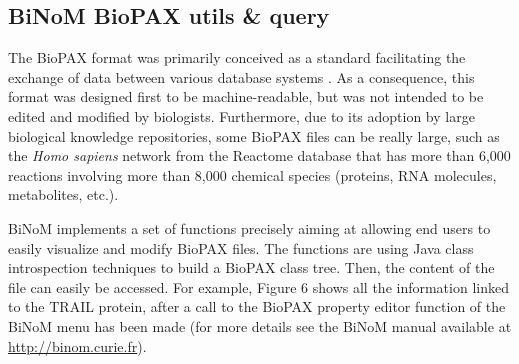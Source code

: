 \documentclass[10pt]{bmc_article}
\newenvironment{bmcformat}{\baselineskip20pt\sloppy\setboolean{publ}{false}}{\baselineskip20pt\sloppy}
\begin{document}
\begin{bmcformat}

\subsection*{BiNoM BioPAX utils \& query}
The BioPAX format was primarily conceived as a standard facilitating the
exchange of data between various database systems \cite{demir2010biopax}. As a
consequence, this format was designed first to be machine-readable, but was not
intended
to be edited and modified by biologists. Furthermore, due to its adoption by
large biological knowledge repositories, some BioPAX files can be really large,
such as the \textit{Homo sapiens} network from the Reactome database
\cite{joshi2005reactome} that has more than 6,000 reactions involving more than
8,000 chemical species (proteins, RNA molecules, metabolites, etc.).

BiNoM implements a set of functions precisely aiming at allowing end users to
easily visualize and modify BioPAX files. The functions are using
Java class introspection techniques to build a BioPAX class tree. Then, the
content of the file can easily be accessed. For example, Figure 6 shows
all the information linked to the TRAIL protein, after a call to the
BioPAX property
editor function of the BiNoM menu has been made (for more details see the BiNoM manual available at \url{http://binom.curie.fr}).




\end{bmcformat}
\end{document}

